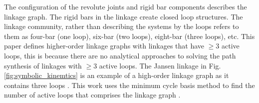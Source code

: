The configuration of the revolute joints and rigid bar components describes the linkage graph. The rigid bars in the linkage create closed loop structures. The linkage community, rather than describing the systems by the loops refers to them as four-bar (one loop), six-bar (two loops), eight-bar (three loops), etc. This paper defines higher-order linkage graphs with linkages that have $\geq$3 active loops, this is because there are no analytical approaches to solving the path synthesis of linkages with $\geq$3 active loops. The Jansen linkage in Fig. \ref{fig:symbolic_kinemtics} is an example of a high-order linkage graph as it contains three loops \cite{Jansen1990Strandbeast}. This work uses the minimum cycle basis method to find the number of active loops that comprises the linkage graph \cite{kavitha_tildeom2n_2008}.

